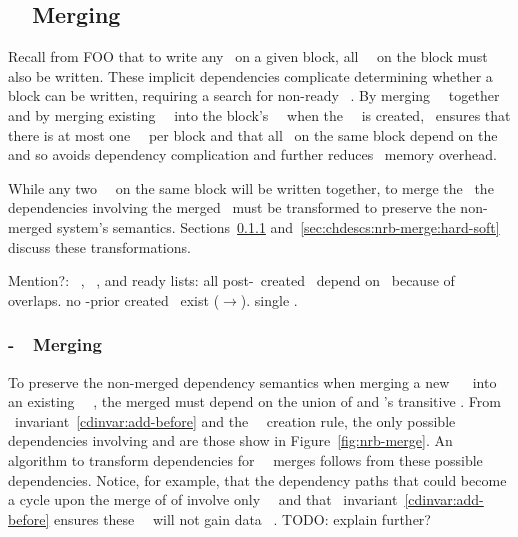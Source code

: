 \subsection{\Nrb\ \ChDesc\ Merging}
\label{sec:chdescs:nrb-merge}
Recall from FOO that to write any \chdesc\ on a given block,
all \nrb\ \chdescs\ on the block must also be written. 
%
These implicit dependencies complicate determining whether a block can
be written, requiring a search for non-ready \nrb\ \chdescs.
%
By merging \nrb\ \chdescs\ together and by merging existing \rb\
\chdescs\ into the block's \nrb\ \chdesc\ when the \nrb\ \chdesc\ is
created,
%
\Kudos\ ensures that there is at most one \nrb\ \chdesc\ per block and
that all \chdescs\ on the same block depend on the \nrb\
\chdesc\,
%
and so avoids dependency complication and further reduces \chdesc\
memory overhead.

While any two \nrb\ \chdescs\ on the same block will be written
together, to merge the \chdescs\ the dependencies involving the merged
\chdescs\ must be transformed to preserve the non-merged system's
semantics.  Sections~\ref{sec:chdescs:nrb-merge:hard-hard}
and~\ref{sec:chdescs:nrb-merge:hard-soft} discuss these
transformations.

Mention?:
%
\Nrb\ \chdescs, \rb\ \chdescs, and ready lists:
%
all post-\nrb\ created \chdescs\ depend on \nrb\ because of overlaps.
%
no \nrb-prior created \chdescs\ exist (\rb{}\(\rightarrow\)\nrb{}).
%
single \nrb.

\subsubsection{\Nrb-\Nrb\ \ChDesc\ Merging}
\label{sec:chdescs:nrb-merge:hard-hard}
To preserve the non-merged dependency semantics when merging a new
\nrb\ \chdesc\  into an existing \nrb\ \chdesc\ \p{p}, the merged
\p{(p+q)} must depend on the union of \p{p} and 's transitive
\befores.
%
From \chdesc\ invariant~\ref{cdinvar:add-before} and the \nrb\
\chdesc\ creation rule, the only possible dependencies involving 
and \p{q} are those show in Figure~\ref{fig:nrb-merge}.
%
An algorithm to transform dependencies for \nrb\ \chdesc\ merges
follows from these possible dependencies.
%
Notice, for example, that the dependency paths that could become a
cycle upon the merge of \p{p} of \p{q} involve only \noop\ \chdescs\
and that \chdesc\ invariant~\ref{cdinvar:add-before} ensures these
\noop\ \chdesc\ will not gain data \chdesc\ \befores.
%
TODO: explain further?

